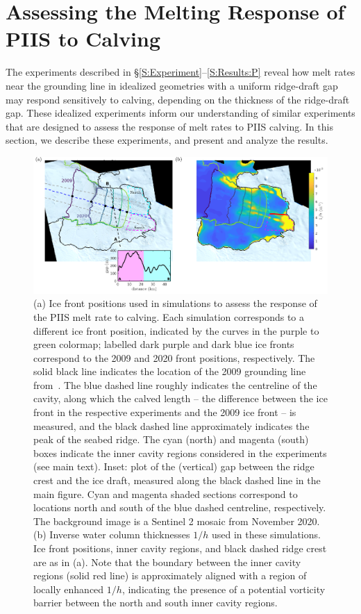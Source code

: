 \documentclass[draft]{agujournal2019}
\begin{document}
\section{Assessing the Melting Response of PIIS to Calving}\label{S:Realistic}
The experiments described in \S\ref{S:Experiment}--\ref{S:Results:P} reveal how melt rates near the grounding line in idealized geometries with a uniform ridge-draft gap may respond sensitively to calving, depending on the thickness of the ridge-draft gap. These idealized experiments inform our understanding of similar experiments that are designed to assess the response of melt rates to PIIS calving. In this section, we describe these experiments, and present and analyze the results.

\begin{figure}
    \centering
    \includegraphics[width =\textwidth]{../make_figures/plots/figure10.pdf}
    \caption{(a) Ice front positions used in simulations to assess the response of the PIIS melt rate to calving. Each simulation corresponds to a different ice front position, indicated by the curves in the purple to green colormap; labelled dark purple and dark blue ice fronts correspond to the 2009 and 2020 front positions, respectively. The solid black line indicates the location of the 2009 grounding line from~. The blue dashed line roughly indicates the centreline of the cavity, along which the calved length -- the difference between the ice front in the respective experiments and the 2009 ice front -- is measured, and the black dashed line approximately indicates the peak of the seabed ridge. The cyan (north) and magenta (south) boxes indicate the inner cavity regions considered in the experiments (see main text). Inset: plot of the (vertical) gap between the ridge crest and the ice draft, measured along the black dashed line in the main figure. Cyan and magenta shaded sections correspond to locations north and south of the blue dashed centreline, respectively. The background image is a Sentinel 2 mosaic from November 2020. (b) Inverse water column thicknesses $1/h$ used in these simulations. Ice front positions, inner cavity regions, and black dashed ridge crest are as in (a).  Note that the boundary between the inner cavity regions (solid red line) is approximately aligned with a region of locally enhanced $1/h$, indicating the presence of a potential vorticity barrier between the north and south inner cavity regions.}
    \label{fig:figure10}
\end{figure}
\end{document}
